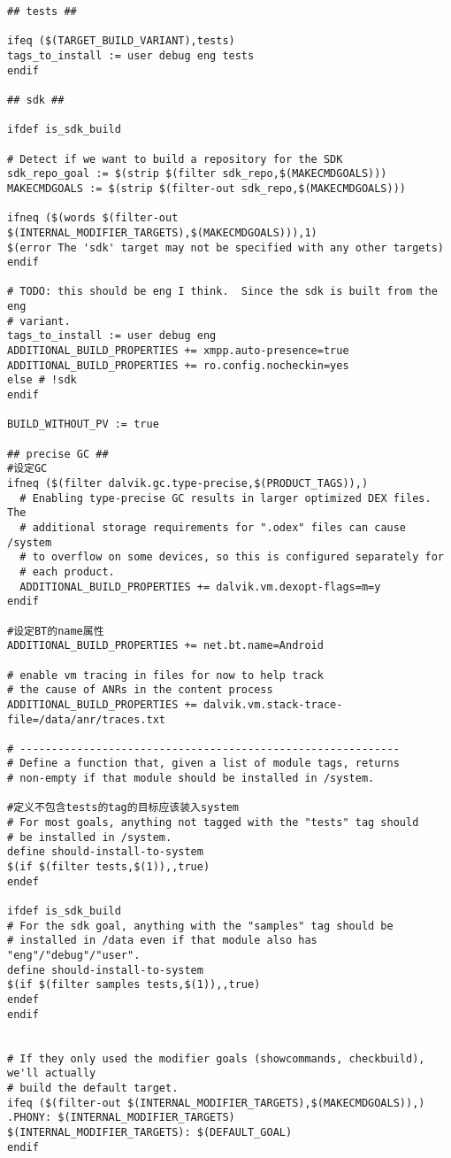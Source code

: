 \documentclass[12pt,a4paper]{article}
\begin{document}
\begin{verbatim}
## tests ##

ifeq ($(TARGET_BUILD_VARIANT),tests)
tags_to_install := user debug eng tests
endif

## sdk ##

ifdef is_sdk_build

# Detect if we want to build a repository for the SDK
sdk_repo_goal := $(strip $(filter sdk_repo,$(MAKECMDGOALS)))
MAKECMDGOALS := $(strip $(filter-out sdk_repo,$(MAKECMDGOALS)))

ifneq ($(words $(filter-out $(INTERNAL_MODIFIER_TARGETS),$(MAKECMDGOALS))),1)
$(error The 'sdk' target may not be specified with any other targets)
endif

# TODO: this should be eng I think.  Since the sdk is built from the eng
# variant.
tags_to_install := user debug eng
ADDITIONAL_BUILD_PROPERTIES += xmpp.auto-presence=true
ADDITIONAL_BUILD_PROPERTIES += ro.config.nocheckin=yes
else # !sdk
endif

BUILD_WITHOUT_PV := true

## precise GC ##
#设定GC
ifneq ($(filter dalvik.gc.type-precise,$(PRODUCT_TAGS)),)
  # Enabling type-precise GC results in larger optimized DEX files.  The
  # additional storage requirements for ".odex" files can cause /system
  # to overflow on some devices, so this is configured separately for
  # each product.
  ADDITIONAL_BUILD_PROPERTIES += dalvik.vm.dexopt-flags=m=y
endif

#设定BT的name属性
ADDITIONAL_BUILD_PROPERTIES += net.bt.name=Android

# enable vm tracing in files for now to help track
# the cause of ANRs in the content process
ADDITIONAL_BUILD_PROPERTIES += dalvik.vm.stack-trace-file=/data/anr/traces.txt

# ------------------------------------------------------------
# Define a function that, given a list of module tags, returns
# non-empty if that module should be installed in /system.

#定义不包含tests的tag的目标应该装入system
# For most goals, anything not tagged with the "tests" tag should
# be installed in /system.
define should-install-to-system
$(if $(filter tests,$(1)),,true)
endef

ifdef is_sdk_build
# For the sdk goal, anything with the "samples" tag should be
# installed in /data even if that module also has "eng"/"debug"/"user".
define should-install-to-system
$(if $(filter samples tests,$(1)),,true)
endef
endif


# If they only used the modifier goals (showcommands, checkbuild), we'll actually
# build the default target.
ifeq ($(filter-out $(INTERNAL_MODIFIER_TARGETS),$(MAKECMDGOALS)),)
.PHONY: $(INTERNAL_MODIFIER_TARGETS)
$(INTERNAL_MODIFIER_TARGETS): $(DEFAULT_GOAL)
endif


\end{verbatim}
\end{document}
